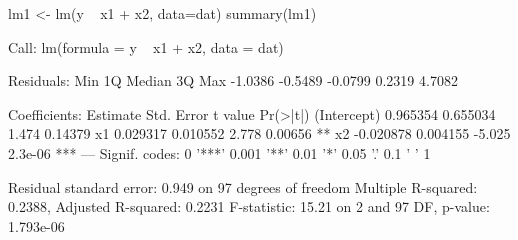 \begin{Schunk}
\begin{Sinput}
 lm1 <- lm(y ~ x1 + x2, data=dat)
 summary(lm1)
\end{Sinput}
\begin{Soutput}
Call:
lm(formula = y ~ x1 + x2, data = dat)

Residuals:
    Min      1Q  Median      3Q     Max 
-1.0386 -0.5489 -0.0799  0.2319  4.7082 

Coefficients:
             Estimate Std. Error t value Pr(>|t|)    
(Intercept)  0.965354   0.655034   1.474  0.14379    
x1           0.029317   0.010552   2.778  0.00656 ** 
x2          -0.020878   0.004155  -5.025  2.3e-06 ***
---
Signif. codes:  0 '***' 0.001 '**' 0.01 '*' 0.05 '.' 0.1 ' ' 1

Residual standard error: 0.949 on 97 degrees of freedom
Multiple R-squared:  0.2388,	Adjusted R-squared:  0.2231 
F-statistic: 15.21 on 2 and 97 DF,  p-value: 1.793e-06
\end{Soutput}
\end{Schunk}
